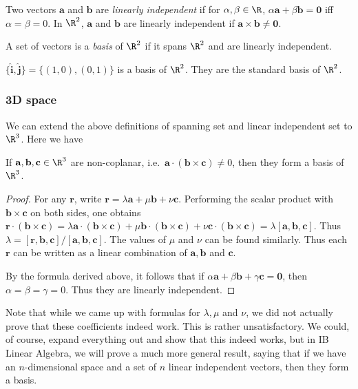 \documentclass[a4paper]{article}
\begin{document}
\begin{defi}
  Two vectors $\mathbf{a}$ and $\mathbf{b}$ are \emph{linearly independent} if for $\alpha, \beta\in \R$, $\alpha\mathbf{a} + \beta\mathbf{b} = \mathbf{0}$ iff $\alpha = \beta = 0$. In $\R^2$, $\mathbf{a}$ and $\mathbf{b}$ are linearly independent if $\mathbf{a\times b} \not= \mathbf{0}$.
\end{defi}

\begin{defi}[Basis of $\R^2$]
  A set of vectors is a \emph{basis} of $\R^2$ if it spans $\R^2$ and are linearly independent.
\end{defi}

\begin{eg}
  $\{\hat{\mathbf{i}}, \hat{\mathbf{j}}\} = \{(1, 0), (0, 1)\}$ is a basis of $\R^2$. They are the standard basis of $\R^2$.
\end{eg}

\subsubsection{3D space}
We can extend the above definitions of spanning set and linear independent set to $\R^3$. Here we have
\begin{thm}
  If $\mathbf{a}, \mathbf{b}, \mathbf{c}\in\R^3$ are non-coplanar, i.e.\ $\mathbf{a}\cdot(\mathbf{b}\times \mathbf{c})\not= 0$, then they form a basis of $\R^3$.
\end{thm}

\begin{proof}
  For any $\mathbf{r}$, write $\mathbf{r} = \lambda\mathbf{a} + \mu\mathbf{b} + \nu\mathbf{c}$. Performing the scalar product with $\mathbf{b\times c}$ on both sides, one obtains $\mathbf{r\cdot(b\times c)} = \lambda \mathbf{a\cdot(b\times c)} + \mu\mathbf{b\cdot (b\times c)} + \nu\mathbf{c\cdot(b\times c)} = \lambda \mathbf{[a, b, c]}$. Thus $\lambda = \mathbf{[r, b, c]/[a,b, c]}$. The values of $\mu$ and $\nu$ can be found similarly. Thus each $\mathbf{r}$ can be written as a linear combination of $\mathbf{a}, \mathbf{b}$ and $\mathbf{c}$.

  By the formula derived above, it follows that if $\alpha\mathbf{a} + \beta\mathbf{b} + \gamma\mathbf{c} = \mathbf{0}$, then $\alpha = \beta = \gamma = 0$. Thus they are linearly independent.
\end{proof}
Note that while we came up with formulas for $\lambda, \mu$ and $\nu$, we did not actually prove that these coefficients indeed work. This is rather unsatisfactory. We could, of course, expand everything out and show that this indeed works, but in IB Linear Algebra, we will prove a much more general result, saying that if we have an $n$-dimensional space and a set of $n$ linear independent vectors, then they form a basis.
\end{document}
